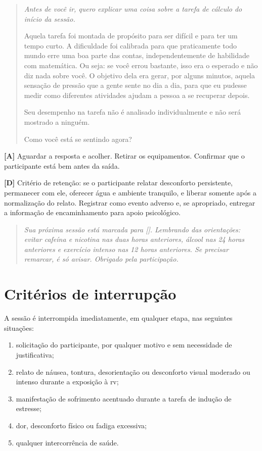 \begin{quote}\itshape
Antes de você ir, quero explicar uma coisa sobre a tarefa de cálculo do início da sessão.

Aquela tarefa foi montada de propósito para ser difícil e para ter um tempo curto. A dificuldade foi calibrada para que praticamente todo mundo erre uma boa parte das contas, independentemente de habilidade com matemática. Ou seja: se você errou bastante, isso era o esperado e não diz nada sobre você. O objetivo dela era gerar, por alguns minutos, aquela sensação de pressão que a gente sente no dia a dia, para que eu pudesse medir como diferentes atividades ajudam a pessoa a se recuperar depois.

Seu desempenho na tarefa não é analisado individualmente e não será mostrado a ninguém.

Como você está se sentindo agora?
\end{quote}

\noindent\textbf{[A]} Aguardar a resposta e acolher. Retirar os equipamentos. Confirmar que o participante está bem antes da saída.

\noindent\textbf{[D]} Critério de retenção: se o participante relatar desconforto persistente, permanecer com ele, oferecer água e ambiente tranquilo, e liberar somente após a normalização do relato. Registrar como evento adverso e, se apropriado, entregar a informação de encaminhamento para apoio psicológico.

\begin{quote}\itshape
Sua próxima sessão está marcada para [\underline{\hspace{2cm}}]. Lembrando das orientações: evitar cafeína e nicotina nas duas horas anteriores, álcool nas 24 horas anteriores e exercício intenso nas 12 horas anteriores. Se precisar remarcar, é só avisar. Obrigado pela participação.
\end{quote}

\section*{Critérios de interrupção}

A sessão é interrompida imediatamente, em qualquer etapa, nas seguintes situações:

\begin{enumerate}
    \item solicitação do participante, por qualquer motivo e sem necessidade de justificativa;
    \item relato de náusea, tontura, desorientação ou desconforto visual moderado ou intenso durante a exposição à \gls{rv};
    \item manifestação de sofrimento acentuado durante a tarefa de indução de estresse;
    \item dor, desconforto físico ou fadiga excessiva;
    \item qualquer intercorrência de saúde.
\end{enumerate}

